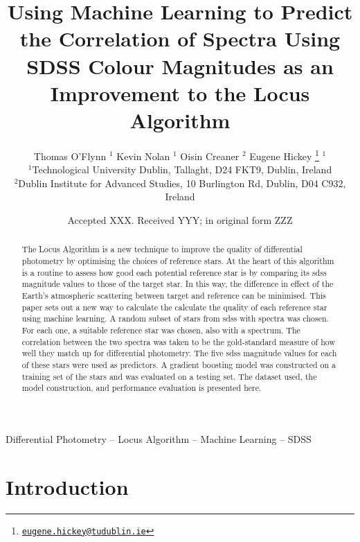 \documentclass[a4paper,fleqn,usenatbib]{mnras}
\title[Predicting Correlation of Spectra Using SDSS Colour
Magnitudes]{Using Machine Learning to Predict the Correlation of Spectra
Using SDSS Colour Magnitudes as an Improvement to the Locus Algorithm}
\author[E. Hickey et al.]{
	Thomas O'Flynn
				$^{1}$
		Kevin Nolan
				$^{1}$
		Oisin Creaner
				$^{2}$
		Eugene Hickey
			\thanks{\href{mailto:eugene.hickey@tudublin.ie}{\nolinkurl{eugene.hickey@tudublin.ie}}}
				$^{1}$
	\\
			$^{1}$Technological University Dublin, Tallaght, D24 FKT9, Dublin,
Ireland\\
			$^{2}$Dublin Institute for Advanced Studies, 10 Burlington Rd,
Dublin, D04 C932, Ireland}
\date{Accepted XXX. Received YYY; in original form ZZZ}
\begin{document}
\label{firstpage}
\pagerange{\pageref{firstpage}--\pageref{lastpage}}


\maketitle

\begin{abstract}
The Locus Algorithm is a new technique to improve the quality of
differential photometry by optimising the choices of reference stars. At
the heart of this algorithm is a routine to assess how good each
potential reference star is by comparing its sdss magnitude values to
those of the target star. In this way, the difference in effect of the
Earth's atmospheric scattering between target and reference can be
minimised. This paper sets out a new way to calculate the calculate the
quality of each reference star using machine learning. A random subset
of stars from sdss with spectra was chosen. For each one, a suitable
reference star was chosen, also with a spectrum. The correlation between
the two spectra was taken to be the gold-standard measure of how well
they match up for differential photometry. The five sdss magnitude
values for each of these stars were used as predictors. A gradient
boosting model was constructed on a training set of the stars and was
evaluated on a testing set. The dataset used, the model construction,
and performance evaluation is presented here.
\end{abstract}

\begin{keywords}
Differential Photometry -- Locus Algorithm -- Machine Learning -- SDSS
\end{keywords}



\hypertarget{introduction}{%
\section{Introduction}\label{introduction}}
\end{document}

